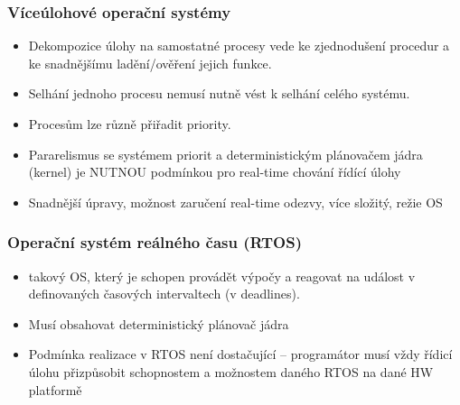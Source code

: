 \subsubsection*{Víceúlohové operační systémy}
\begin{itemize}
    \item Dekompozice úlohy na samostatné procesy vede ke zjednodušení procedur a ke snadnějšímu ladění/ověření jejich funkce.
    \item Selhání jednoho procesu nemusí nutně vést k selhání celého systému.
    \item Procesům lze různě přiřadit priority.
    \item Pararelismus se systémem priorit a deterministickým plánovačem jádra (kernel) je NUTNOU podmínkou pro real-time chování řídící úlohy
    \item Snadnější úpravy, možnost zaručení real-time odezvy, více složitý, režie OS
\end{itemize}

\subsubsection*{Operační systém reálného času (RTOS)}
\begin{itemize}
    \item takový OS, který je schopen provádět výpočy a reagovat na událost v definovaných časových intervaltech (v deadlines).
    \item Musí obsahovat deterministický plánovač jádra
    \item Podmínka realizace v RTOS není dostačující – programátor musí vždy řídicí úlohu přizpůsobit schopnostem a možnostem daného RTOS na dané HW platformě
\end{itemize}


